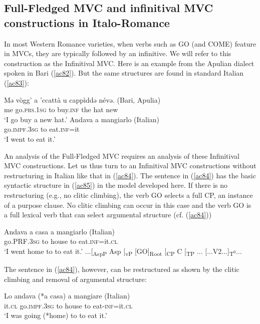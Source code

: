 \documentclass[output=paper]{langscibook}
\begin{document}
\subsection{Full-Fledged MVC and infinitival MVC constructions in Italo-Romance}

In most Western Romance varieties, when verbs such as GO (and COME) feature in MVCs, they are typically followed by an infinitive. We will refer to this construction as the Infinitival MVC. Here is an example from the Apulian dialect spoken in Bari (\ref{ac82}).  But the same structures are found in standard Italian (\ref{ac83}):

\ea \label{ac82}\gll Mə  vògg’    a  ’ccattà  u  cappìddə  névə.   \hfill (Bari, Apulia)\\
   me  go.\textsc{prs}.\textsc{1sg} to  buy.\textsc{inf}  the  hat    new {}\\
   \glt ‘I go buy a new hat.’ \hfill \citep[231]{andriani2017a}
\ex \label{ac83}\gll Andava      a     mangiarlo      \hfill (Italian)\\
     go.\textsc{impf}.\textsc{3sg}   to    eat.\textsc{inf}=it {}\\
    \glt ‘I went to eat it.’
\z

An analysis of the Full-Fledged MVC requires an analysis of these Infinitival MVC constructions. Let us thus turn to an Infinitival MVC constructions without restructuring in Italian like that in (\ref{ac84}).  The sentence in (\ref{ac84}) has the basic syntactic structure in (\ref{ac85}) in the model developed here.  If there is no restructuring (e.g., no clitic climbing), the verb GO selects a full CP, an instance of a purpose clause. No clitic climbing can occur in this case and the verb GO is a full lexical verb that can select argumental structure (cf. (\ref{ac84}))

\ea \label{ac84}\gll Andava   a casa   a    mangiarlo       \hfill (Italian)\\
    go.PRF.\textsc{3sg} to house  to   eat.\textsc{inf}=it.\textsc{cl}\\
    \glt ‘I went home to to eat it.’
\ex \label{ac85}...[\textsubscript{AspP} Asp [\textsubscript{vP} [GO]\textsubscript{Root} [\textsubscript{CP} C [\textsubscript{TP} ... [...V2...]\textsubscript{T$^0$}...
\z

The sentence in (\ref{ac84}), however, can be restructured as shown by the clitic climbing and removal of argumental structure:

\ea \label{ac86}\gll Lo   andava    (*a casa) a mangiare  \hfill    (Italian)\\
    it.\textsc{cl} go.\textsc{impf}.\textsc{3sg}  to house to  eat-\textsc{inf}=it.\textsc{cl}\\
    \glt ‘I was going  (*home) to to eat it.’
\z
\end{document}
